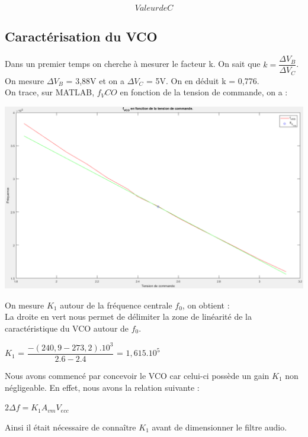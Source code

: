 \documentclass[a4paper]{report}
\begin{document}
$$Valeur de C$$

\subsection{Caractérisation du VCO}
Dans un premier temps on cherche à mesurer le facteur k. On sait que $k=\dfrac{\Delta V_B}{\Delta V_C}$.
On mesure $\Delta V_B$ = 3,88V et on a $\Delta V_C$ = 5V. On en déduit k = 0,776.\\
On trace, sur MATLAB, $f_VCO$ en fonction de la tension de commande, on a : \\
\begin{center}
\includegraphics[width=1\textwidth]{fvco.PNG}
\end{center}
On mesure $K_1$ autour de la fréquence centrale $f_0$, on obtient : \\
La droite en vert nous permet de délimiter la zone de linéarité de la caractéristique du VCO autour de $f_0$.
\begin{center}
$K_1$ = $\dfrac{-(240,9-273,2).10^3}{2.6-2.4}$ = $1,615.10^5$\\
\end{center}
Nous avons commencé par concevoir le VCO car celui-ci possède un gain $K_1$ non négligeable. En effet, nous avons la relation suivante : \\
\begin{center}
$2\Delta f = K_1 A_{vm} V_{ecc}$
\end{center}
Ainsi il était nécessaire de connaître $K_1$ avant de dimensionner le filtre audio.\\
\end{document}
